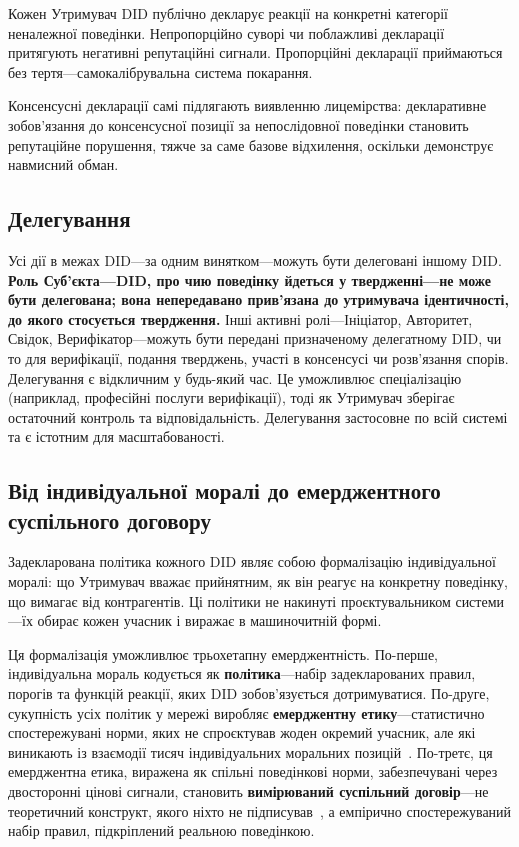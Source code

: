 \documentclass[11pt,a4paper,twocolumn]{article}
\begin{document}
Кожен Утримувач DID публічно декларує реакції на конкретні категорії неналежної поведінки. Непропорційно суворі чи поблажливі декларації притягують негативні репутаційні сигнали. Пропорційні декларації приймаються без тертя---самокалібрувальна система покарання.

Консенсусні декларації самі підлягають виявленню лицемірства: декларативне зобов'язання до консенсусної позиції за непослідовної поведінки становить репутаційне порушення, тяжче за саме базове відхилення, оскільки демонструє навмисний обман.

\subsection{Делегування}

Усі дії в межах DID---за одним винятком---можуть бути делеговані іншому DID. \textbf{Роль Суб'єкта---DID, про чию поведінку йдеться у твердженні---не може бути делегована; вона непередавано прив'язана до утримувача ідентичності, до якого стосується твердження.} Інші активні ролі---Ініціатор, Авторитет, Свідок, Верифікатор---можуть бути передані призначеному делегатному DID, чи то для верифікації, подання тверджень, участі в консенсусі чи розв'язання спорів. Делегування є відкличним у будь-який час. Це уможливлює спеціалізацію (наприклад, професійні послуги верифікації), тоді як Утримувач зберігає остаточний контроль та відповідальність. Делегування застосовне по всій системі та є істотним для масштабованості.

\subsection{Від індивідуальної моралі до емерджентного суспільного договору}

Задекларована політика кожного DID являє собою формалізацію індивідуальної моралі: що Утримувач вважає прийнятним, як він реагує на конкретну поведінку, що вимагає від контрагентів. Ці політики не накинуті проєктувальником системи---їх обирає кожен учасник і виражає в машиночитній формі.

Ця формалізація уможливлює трьохетапну емерджентність. По-перше, індивідуальна мораль кодується як \textbf{політика}---набір задекларованих правил, порогів та функцій реакції, яких DID зобов'язується дотримуватися. По-друге, сукупність усіх політик у мережі виробляє \textbf{емерджентну етику}---статистично спостережувані норми, яких не спроєктував жоден окремий учасник, але які виникають із взаємодії тисяч індивідуальних моральних позицій~\cite{durkheim1893}. По-третє, ця емерджентна етика, виражена як спільні поведінкові норми, забезпечувані через двосторонні цінові сигнали, становить \textbf{вимірюваний суспільний договір}---не теоретичний конструкт, якого ніхто не підписував~\cite{rawls1971}, а емпірично спостережуваний набір правил, підкріплений реальною поведінкою.
\end{document}
